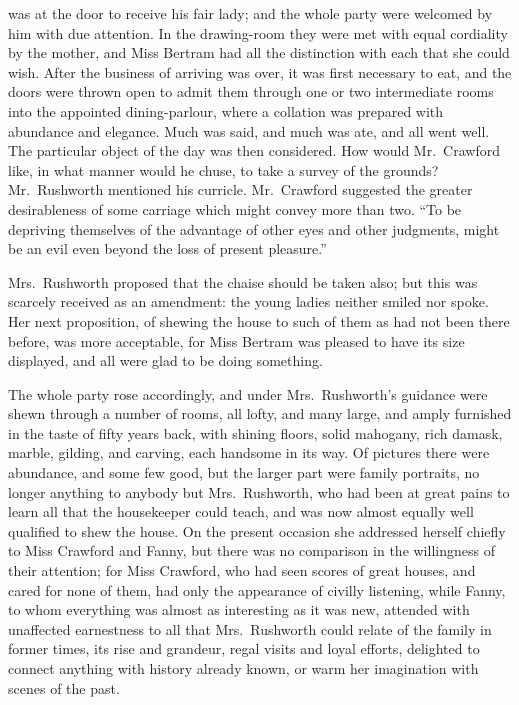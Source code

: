  was at the door to receive his fair lady;
and the whole party were welcomed by him with due attention.
In the drawing-room they were met with equal cordiality
by the mother, and Miss Bertram had all the distinction
with each that she could wish.  After the business
of arriving was over, it was first necessary to eat,
and the doors were thrown open to admit them through one
or two intermediate rooms into the appointed dining-parlour,
where a collation was prepared with abundance and elegance.
Much was said, and much was ate, and all went well.
The particular object of the day was then considered.
How would Mr.\ Crawford like, in what manner would he chuse,
to take a survey of the grounds?  Mr.\ Rushworth mentioned
his curricle.  Mr.\ Crawford suggested the greater desirableness
of some carriage which might convey more than two.
``To be depriving themselves of the advantage of other eyes
and other judgments, might be an evil even beyond the loss
of present pleasure.''

Mrs.\ Rushworth proposed that the chaise should be taken also;
but this was scarcely received as an amendment:  the young
ladies neither smiled nor spoke.  Her next proposition,
of shewing the house to such of them as had not been
there before, was more acceptable, for Miss Bertram was
pleased to have its size displayed, and all were glad
to be doing something.

The whole party rose accordingly, and under Mrs.\ Rushworth's
guidance were shewn through a number of rooms, all lofty,
and many large, and amply furnished in the taste of fifty
years back, with shining floors, solid mahogany, rich damask,
marble, gilding, and carving, each handsome in its way.
Of pictures there were abundance, and some few good,
but the larger part were family portraits, no longer
anything to anybody but Mrs.\ Rushworth, who had been at
great pains to learn all that the housekeeper could teach,
and was now almost equally well qualified to shew the house.
On the present occasion she addressed herself chiefly
to Miss Crawford and Fanny, but there was no comparison
in the willingness of their attention; for Miss Crawford,
who had seen scores of great houses, and cared for none
of them, had only the appearance of civilly listening,
while Fanny, to whom everything was almost as interesting
as it was new, attended with unaffected earnestness to all
that Mrs.\ Rushworth could relate of the family in former times,
its rise and grandeur, regal visits and loyal efforts,
delighted to connect anything with history already known,
or warm her imagination with scenes of the past.

